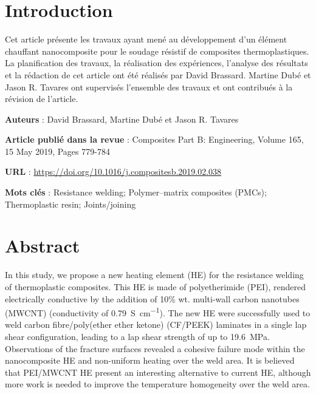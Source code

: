 \label{sec:Theme1}


\section{Introduction}

Cet article présente les travaux ayant mené au développement d'un élément chauffant nanocomposite pour le soudage résistif de composites thermoplastiques. La planification des travaux, la réalisation des expériences, l'analyse des résultats et la rédaction de cet article ont été réalisés par David Brassard. Martine Dubé et Jason R. Tavares ont supervisés l'ensemble des travaux et ont contribués à la révision de l'article. 

\textbf{Auteurs} : David Brassard, Martine Dubé et Jason R. Tavares

\textbf{Article publié dans la revue} : Composites Part B: Engineering, Volume 165, 15 May 2019, Pages 779-784

\textbf{URL} : \url{https://doi.org/10.1016/j.compositesb.2019.02.038}

\textbf{Mots clés} : Resistance welding; Polymer–matrix composites (PMCs); Thermoplastic resin; Joints/joining


\section{Abstract}

In this study, we propose a new heating element (HE) for the resistance welding of thermoplastic composites. 
This HE is made of polyetherimide (PEI), rendered electrically conductive by the addition of 10\% wt. multi-wall carbon nanotubes (MWCNT) (conductivity of \SI{0.79}{\siemens\per\cm}).
The new HE were successfully used to weld carbon fibre/poly(ether ether ketone) (CF/PEEK) laminates in a single lap shear configuration, leading to a lap shear strength of up to \SI{19.6}{\mega\pascal}.
Observations of the fracture surfaces revealed a cohesive failure mode within the nanocomposite HE and non-uniform heating over the weld area. 
It is believed that PEI/MWCNT HE present an interesting alternative to current HE, although more work is needed to improve the temperature homogeneity over the weld area.
	
